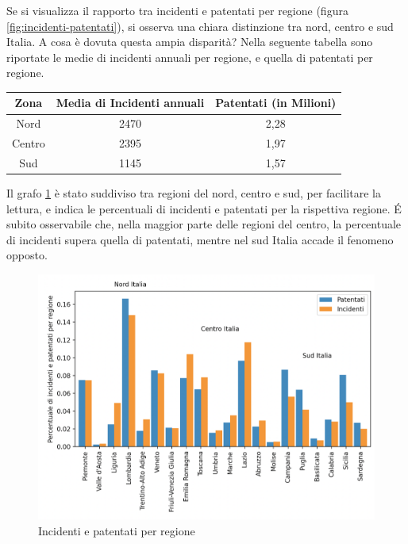 \documentclass[a4paper]{report}
\begin{document}
Se si visualizza il rapporto tra incidenti e patentati per regione (figura \ref{fig:incidenti-patentati}), 
si osserva una chiara distinzione tra nord, centro e sud Italia.
A cosa è dovuta questa ampia disparità?
Nella seguente tabella sono riportate le medie di incidenti annuali per regione, 
e quella di patentati per regione.

\begin{center}
    \def\arraystretch{1.5}%
    \begin{tabular}{ |c|c|c| } 
    \hline
    Zona & Media di Incidenti annuali & Patentati (in Milioni) \\ 
    \hline
    \rowcolor{TableGray}
    Nord & 2470 & 2,28 \\ 
    Centro & 2395 & 1,97 \\ 
    \rowcolor{TableGray}
    Sud & 1145 & 1,57 \\ 
    \hline
    \end{tabular}
\end{center}

Il grafo \ref{fig:incidenti-patentati-bar} è stato suddiviso tra regioni del nord, centro e sud, per facilitare 
la lettura, e indica le percentuali di incidenti e patentati per la rispettiva regione. 
\'E subito osservabile che, nella maggior parte delle regioni del centro, la percentuale di incidenti 
supera quella di patentati, mentre nel sud Italia accade il fenomeno opposto.

\begin{figure}
    \includegraphics[width=\linewidth]{../src/incidenti/incidenti_aci/mappe_regioni/incidenti_patenti_bar.png}
    \caption{Incidenti e patentati per regione}
    \label{fig:incidenti-patentati-bar}
\end{figure}
\end{document}
